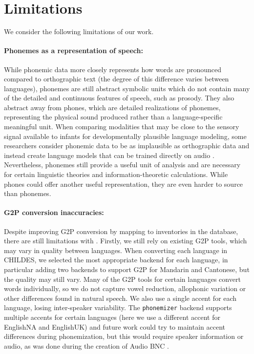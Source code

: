 \section{Limitations}\label{sec:13-limitations}

We consider the following limitations of our work. 

\paragraph{Phonemes as a representation of speech:} While phonemic data more closely represents how words are pronounced compared to orthographic text (the degree of this difference varies between languages), phonemes are still abstract symbolic units which do not contain many of the detailed and continuous features of speech, such as prosody. They also abstract away from phones, which are detailed realizations of phonemes, representing the physical sound produced rather than a language-specific meaningful unit. When comparing modalities that may be close to the sensory signal available to infants for developmentally plausible language modeling, some researchers consider phonemic data to be as implausible as orthographic data \citep{lavechin} and instead create language models that can be trained directly on audio \citep{kamper2017segmental, nguyen2020zero, hsu2021hubert, dunbar2021zero}. Nevertheless, phonemes still provide a useful unit of analysis and are necessary for certain linguistic theories and information-theoretic calculations. While phones could offer another useful representation, they are even harder to source than phonemes.


\paragraph{G2P conversion inaccuracies:} Despite improving G2P conversion by mapping to inventories in the \phoible database, there are still limitations with \gpp. Firstly, we still rely on existing G2P tools, which may vary in quality between languages. When converting each language in CHILDES, we selected the most appropriate backend for each language, in particular adding two backends to support G2P for Mandarin and Cantonese, but the quality may still vary. Many of the G2P tools for certain languages convert words individually, so we do not capture vowel reduction, allophonic variation or other differences found in natural speech. We also use a single accent for each language, losing inter-speaker variability. The \texttt{phonemizer} backend supports multiple accents for certain languages (here we use a different accent for EnglishNA and EnglishUK) and future work could try to maintain accent differences during phonemization, but this would require speaker information or audio, as was done during the creation of Audio BNC \citep{coleman2012audio}.

